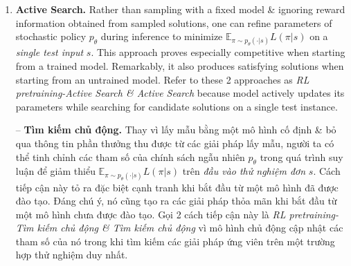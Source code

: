 \documentclass{article}
\begin{document}
\begin{itemize}
\begin{enumerate}
        {\bf Sampling.} Our 1st approach is simply to sample multiple candidate tours from our stochastic policy $p_\theta(\cdot|s)$ \& select shortest one. In contrast to heuristic solvers, do not enforce our model to sample different tours during process. However, can control diversity of sampled tours with a temperature hyperparameter when sampling from our non-parametric softmax (Appendix A.2). This sampling process yields significant improvements over greedy decoding, which always selects index with largest probability. Also considered perturbing pointing mechanism with random noise \& greedily decoding from obtained modified policy, similarly to (Cho, 2016), but this proves less effective than sampling in our experiments.
        
        -- {\bf Lấy mẫu.} Cách tiếp cận đầu tiên của chúng tôi chỉ đơn giản là lấy mẫu nhiều chuyến đi ứng viên từ chính sách ngẫu nhiên $p_\theta(\cdot|s)$ \& chọn chuyến đi ngắn nhất. Trái ngược với các trình giải quyết theo phương pháp heuristic, không áp đặt mô hình của chúng tôi để lấy mẫu các chuyến đi khác nhau trong quá trình. Tuy nhiên, có thể kiểm soát tính đa dạng của các chuyến đi được lấy mẫu bằng siêu tham số nhiệt độ khi lấy mẫu từ softmax không tham số của chúng tôi (Phụ lục A.2). Quá trình lấy mẫu này mang lại những cải tiến đáng kể so với giải mã tham lam, giải mã này luôn chọn chỉ mục có xác suất lớn nhất. Cũng được xem xét cơ chế trỏ nhiễu với nhiễu ngẫu nhiên \& giải mã tham lam từ chính sách đã sửa đổi thu được, tương tự như (Cho, 2016), nhưng điều này tỏ ra kém hiệu quả hơn so với lấy mẫu trong các thí nghiệm của chúng tôi.
        \item {\bf Active Search.} Rather than sampling with a fixed model \& ignoring reward information obtained from sampled solutions, one can refine parameters of stochastic policy $p_\theta$ during inference to minimize $\mathbb{E}_{\pi\sim p_\theta(\cdot|s)} L(\pi|s)$ on a {\it single test input} $s$. This approach proves especially competitive when starting from a trained model. Remarkably, it also produces satisfying solutions when starting from an untrained model. Refer to these 2 approaches as {\it RL pretraining-Active Search \& Active Search} because model actively updates its parameters while searching for candidate solutions on a single test instance.
        
        -- {\bf Tìm kiếm chủ động.} Thay vì lấy mẫu bằng một mô hình cố định \& bỏ qua thông tin phần thưởng thu được từ các giải pháp lấy mẫu, người ta có thể tinh chỉnh các tham số của chính sách ngẫu nhiên $p_\theta$ trong quá trình suy luận để giảm thiểu $\mathbb{E}_{\pi\sim p_\theta(\cdot|s)} L(\pi|s)$ trên {\it đầu vào thử nghiệm đơn} $s$. Cách tiếp cận này tỏ ra đặc biệt cạnh tranh khi bắt đầu từ một mô hình đã được đào tạo. Đáng chú ý, nó cũng tạo ra các giải pháp thỏa mãn khi bắt đầu từ một mô hình chưa được đào tạo. Gọi 2 cách tiếp cận này là {\it RL pretraining-Tìm kiếm chủ động \& Tìm kiếm chủ động} vì mô hình chủ động cập nhật các tham số của nó trong khi tìm kiếm các giải pháp ứng viên trên một trường hợp thử nghiệm duy nhất.
        

\end{enumerate}
\end{itemize}
\end{document}
